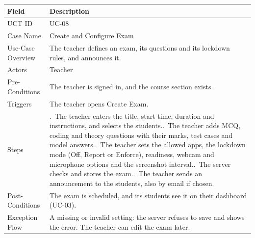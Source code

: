 \begin{lrbox}{\uctbox}{\small\renewcommand{\arraystretch}{1.1}\setlength{\tabcolsep}{6pt}%
\begin{tabular}{>{\raggedright\arraybackslash}p{3.6cm}>{\raggedright\arraybackslash}p{\dimexpr\textwidth-3.6cm-4\tabcolsep\relax}}
\hline\hline
\textbf{Field} & \textbf{Description} \\ \hline
UCT ID & UC-08 \\
Case Name & Create and Configure Exam \\
Use-Case Overview & The teacher defines an exam, its questions and its lockdown rules, and announces it. \\
Actors & Teacher \\
Pre-Conditions & The teacher is signed in, and the course section exists. \\
Triggers & The teacher opens Create Exam. \\
Steps & 1.~The teacher enters the title, start time, duration and instructions, and selects the students.\newline
2.~The teacher adds MCQ, coding and theory questions with their marks, test cases and model answers.\newline
3.~The teacher sets the allowed apps, the lockdown mode (Off, Report or Enforce), readiness, webcam and microphone options and the screenshot interval.\newline
4.~The server checks and stores the exam.\newline
5.~The teacher sends an announcement to the students, also by email if chosen. \\
Post-Conditions & The exam is scheduled, and its students see it on their dashboard (UC-03). \\
Exception Flow & A missing or invalid setting: the server refuses to save and shows the error. The teacher can edit the exam later. \\
\hline\hline
\end{tabular}}\end{lrbox}
\begin{table}[H]
\centering
\caption{Use Case Table for Create and Configure Exam}\label{tab:uc08}
\vspace{4pt}
\usebox{\uctbox}
\end{table}

